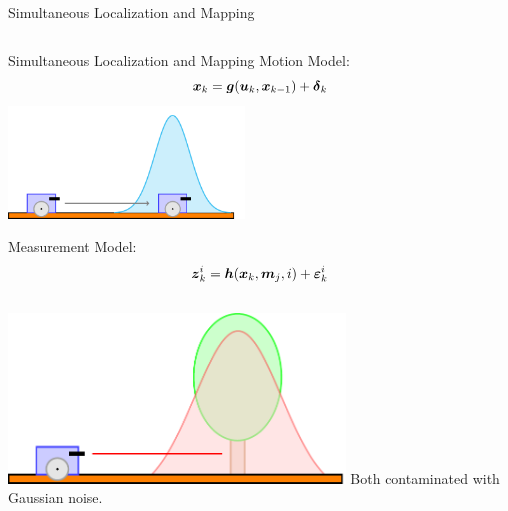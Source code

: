 \documentclass{beamer}
\begin{document}
\begin{frame}{Simultaneous Localization and Mapping}
\begin{columns}
\end{columns}
\end{frame}

\begin{frame}{Simultaneous Localization and Mapping}
Motion Model:
\begin{equation*}
\boldsymbol{x}_k = \boldsymbol{g}(\boldsymbol{u}_k, \boldsymbol{x}_{k-1}) + \boldsymbol{\delta}_k
\label{eq:motion-model}
\end{equation*}  
\centering
\includegraphics[width=0.47\textwidth]{tikz/motion.pdf}\\
\pause
\raggedright
Measurement Model:
\begin{equation*}
\boldsymbol{z}_k^i = \boldsymbol{h}(\boldsymbol{x}_k,\boldsymbol{m}_j,i) + \boldsymbol{\varepsilon}_k^i
\label{eq:measurement-model}
\end{equation*}
\vspace{-1em}
\begin{columns}
\raggedleft
\includegraphics[width=0.67\textwidth]{tikz/measurements.pdf}
Both contaminated with Gaussian noise.
\end{columns}
\end{frame}
\end{document}
